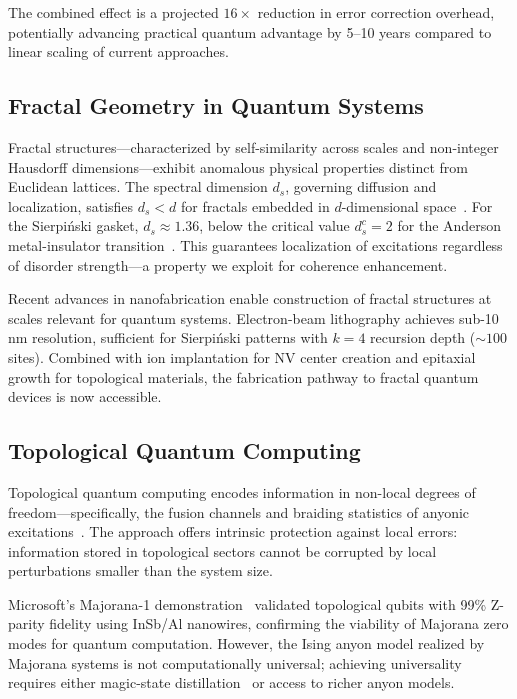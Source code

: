 \documentclass[aps,prx,twocolumn,superscriptaddress,showpacs,showkeys,floatfix]{revtex4-2}
\theoremstyle{plain}
\theoremstyle{definition}
\begin{document}
The combined effect is a projected $16\times$ reduction in error correction overhead, potentially advancing practical quantum advantage by 5--10 years compared to linear scaling of current approaches.

\subsection{Fractal Geometry in Quantum Systems}

Fractal structures---characterized by self-similarity across scales and non-integer Hausdorff dimensions---exhibit anomalous physical properties distinct from Euclidean lattices. The spectral dimension $d_s$, governing diffusion and localization, satisfies $d_s < d$ for fractals embedded in $d$-dimensional space~\cite{Rammal1983,Alexander1982}. For the Sierpi\'{n}ski gasket, $d_s \approx 1.36$, below the critical value $d_s^c = 2$ for the Anderson metal-insulator transition~\cite{Anderson1958}. This guarantees localization of excitations regardless of disorder strength---a property we exploit for coherence enhancement.

Recent advances in nanofabrication enable construction of fractal structures at scales relevant for quantum systems. Electron-beam lithography achieves sub-10 nm resolution, sufficient for Sierpi\'{n}ski patterns with $k = 4$ recursion depth ($\sim 100$ sites). Combined with ion implantation for NV center creation and epitaxial growth for topological materials, the fabrication pathway to fractal quantum devices is now accessible.

\subsection{Topological Quantum Computing}

Topological quantum computing encodes information in non-local degrees of freedom---specifically, the fusion channels and braiding statistics of anyonic excitations~\cite{Kitaev2003,Nayak2008}. The approach offers intrinsic protection against local errors: information stored in topological sectors cannot be corrupted by local perturbations smaller than the system size.

Microsoft's Majorana-1 demonstration~\cite{Microsoft2025} validated topological qubits with 99\% Z-parity fidelity using InSb/Al nanowires, confirming the viability of Majorana zero modes for quantum computation. However, the Ising anyon model realized by Majorana systems is not computationally universal; achieving universality requires either magic-state distillation~\cite{Bravyi2005} or access to richer anyon models.
\end{document}
